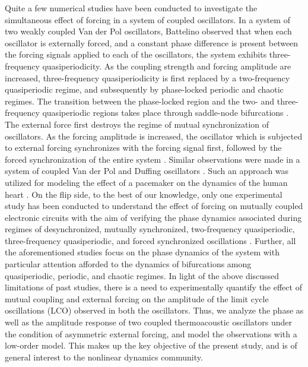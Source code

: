 \documentclass[%
preprint,
 amsmath,amssymb,
 aps,
 pra,
]{revtex4-2}
\begin{document}
Quite a few numerical studies have been conducted to investigate the simultaneous effect of forcing in a system of coupled oscillators. In a system of two weakly coupled Van der Pol oscillators, Battelino \cite{battelino1988persistence} observed that when each oscillator is externally forced, and a constant phase difference is present between the forcing signals applied to each of the oscillators, the system exhibits three-frequency quasiperiodicity. As the coupling strength and forcing amplitude are increased, three-frequency quasiperiodicity is first replaced by a two-frequency quasiperiodic regime, and subsequently by phase-locked periodic and chaotic regimes. The transition between the phase-locked region and the two- and three-frequency quasiperiodic regions takes place through saddle-node bifurcations \cite{anishchenko2009numerical, anishchenko2009phase}. The external force first destroys the regime of mutual synchronization of oscillators. As the forcing amplitude is increased, the oscillator which is subjected to external forcing synchronizes with the forcing signal first, followed by the forced synchronization of the entire system \cite{anishchenko2008bifurcational}. Similar observations were made in a system of coupled Van der Pol and Duffing oscillators \cite{wei2011nonlinear}. Such an approach was utilized for modeling the effect of a pacemaker on the dynamics of the human heart \cite{honerkamp1983heart}. On the flip side, to the best of our knowledge, only one experimental study has been conducted to understand the effect of forcing on mutually coupled electronic circuits with the aim of verifying the phase dynamics associated during regimes of desynchronized, mutually synchronized, two-frequency quasiperiodic, three-frequency quasiperiodic, and forced synchronized oscillations \cite{anishchenko2009numerical}. Further, all the aforementioned studies focus on the phase dynamics of the system with particular attention afforded to the dynamics of bifurcations among quasiperiodic, periodic, and chaotic regimes. In light of the above discussed limitations of past studies, there is a need to experimentally quantify the effect of mutual coupling and external forcing on the amplitude of the limit cycle oscillations (LCO) observed in both the oscillators. Thus, we analyze the phase as well as the amplitude response of two coupled thermoacoustic oscillators under the condition of asymmetric external forcing, {\color{blue}and model the observations with a low-order model.} This makes up the key objective of the present study, and is of general interest to the nonlinear dynamics community.
\end{document}

